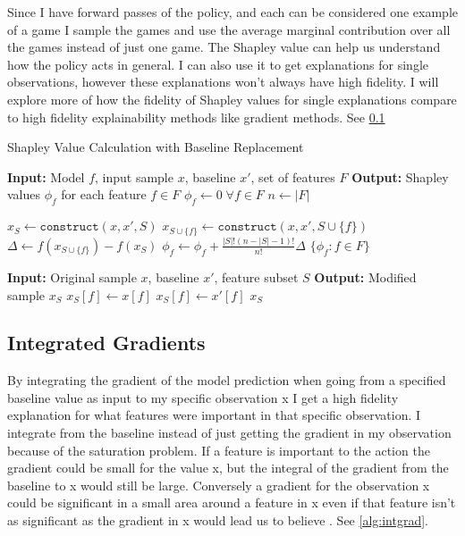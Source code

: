 \documentclass[UKenglish]{uiomasterthesis}
\begin{document}
Since I have forward passes of the policy, and each can be considered one example of a game I sample the games and use the average marginal contribution over all the games instead of just one game.
The Shapley value can help us understand how the policy acts in general. I can also use it to get explanations for single observations, however these explanations won't always have high fidelity. I will explore more of how the fidelity of Shapley values for single explanations compare to high fidelity explainability methods like gradient methods. See \cref{sec:intgrad}

\begin{algorithm}
\caption{Shapley Value Calculation with Baseline Replacement}
\label{alg:shapley}
\begin{algorithmic}
    \State \textbf{Input:} Model $f$, input sample $x$, baseline $x'$, set of features $F$
    \State \textbf{Output:} Shapley values $\phi_f$ for each feature $f \in F$
    \State $\phi_f \gets 0 \; \forall f \in F$ 
    \State $n \gets |F|$ 
    
            \State $x_S \gets \texttt{construct}(x, x', S)$ 
            \State $x_{S \cup \{f\}} \gets \texttt{construct}(x, x', S \cup \{f\})$
            \State $\Delta \gets f(x_{S \cup \{f\}}) - f(x_S)$ 
            \State $\phi_f \gets \phi_f + \frac{|S|!(n - |S| - 1)!}{n!} \Delta$
        \EndFor
    \EndFor
    \State \Return $\{\phi_f : f \in F\}$
    
        \State \textbf{Input:} Original sample $x$, baseline $x'$, feature subset $S$
        \State \textbf{Output:} Modified sample $x_S$
                \State $x_S[f] \gets x[f]$
            \Else
                \State $x_S[f] \gets x'[f]$ 
            \EndIf
        \EndFor
        \State \Return $x_S$
    \EndFunction
\end{algorithmic}
\end{algorithm}

\subsection{Integrated Gradients}
\label{sec:intgrad}
By integrating the gradient of the model prediction when going from a specified baseline value as input to my specific observation x I get a high fidelity explanation for what features were important in that specific observation. I integrate from the baseline instead of just getting the gradient in my observation because of the saturation problem. If a feature is important to the action the gradient could be small for the value x, but the integral of the gradient from the baseline to x would still be large. Conversely a gradient for the observation x could be significant in a small area around a feature in x even if that feature isn't as significant as the gradient in x would lead us to believe \cite{sundararajan2017axiomaticattributiondeepnetworks}. See \cref{alg:intgrad}. 
\end{document}
